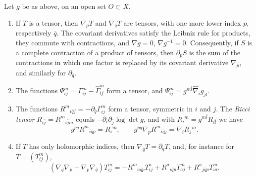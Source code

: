 \begin{lemma}\label{lem:chern-connection-identities}
Let $g$ be as above, on an open set $O\subset X$.
\begin{enumerate}
\item If $T$ is a tensor, then $\nabla_pT$ and $\nabla_{\bar q}T$ are tensors, with one more lower index $p$, respectively $\bar q$. The covariant derivatives satisfy the Leibniz rule for products, they commute with contractions, and $\nabla g=0$, $\nabla g^{-1}=0$. Consequently, if $S$ is a complete contraction of a product of tensors, then $\partial_pS$ is the sum of the contractions in which one factor is replaced by its covariant derivative $\nabla_p$, and similarly for $\partial_{\bar q}$.
\item The functions $\Psi^m_{ij}=\Gamma^m_{ij}-\widehat\Gamma^m_{ij}$ form a tensor, and $\Psi^m_{ij}=g^{m\bar l}\widehat\nabla_ig_{j\bar l}$.
\item The functions $R^m{}_{i\bar qj}=-\partial_{\bar q}\Gamma^m_{ij}$ form a tensor, symmetric in $i$ and $j$. The \emph{Ricci tensor} $R_{i\bar j}=R^m{}_{i\bar jm}$ equals $-\partial_i\partial_{\bar j}\log\det g$, and with $R_i{}^m=g^{m\bar l}R_{i\bar l}$ we have
\[
 g^{p\bar q}R^m{}_{i\bar qp}=R_i{}^m,
 \qquad
 g^{p\bar q}\nabla_pR^m{}_{i\bar qj}=\nabla_iR_j{}^m.
\]
\item If $T$ has only holomorphic indices, then $\nabla_{\bar q}T=\partial_{\bar q}T$, and, for instance for $T=(T^m_{ij})$,
\[
 (\nabla_{\bar q}\nabla_p-\nabla_p\nabla_{\bar q})T^m_{ij}
 =-R^m{}_{a\bar qp}T^a_{ij}+R^a{}_{i\bar qp}T^m_{aj}+R^a{}_{j\bar qp}T^m_{ia}.
\]
\end{enumerate}
\end{lemma}
